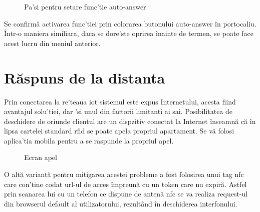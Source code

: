 \begin{figure}[H]
\begin{center}
  \hfil
  \caption{Pa'si pentru setare func'tie auto-answer}
  \label{fig:autoanswer}
\end{center}
\end{figure}

Se confirmă activarea func'tiei prin colorarea butonului auto-answer în portocaliu. Într-o maniera similiara, daca se dore'ste oprirea înainte de termen, se poate face acest lucru din meniul anterior.

\section{Răspuns de la distanta}

Prin conectarea la re'teaua \acrshort{iot} sistemul este expus Internetului, acesta fiind avantajul solu'tiei, dar 'si unul din factorii limitanti ai sai. Posibilitatea de deschidere de oriunde clientul are un dispzitiv conectat la Internet înseamnă că în lipsa cartelei standard \acrfull{rfid} se poate apela propriul apartament. Se vă folosi aplica'tia mobila pentru a se raspunde la propriul apel.

\begin{figure}[H]
\begin{center}
  \hfil
  \caption{Ecran apel}
  \label{fig:ringing}
\end{center}
\end{figure}

O altă variantă pentru mitigarea acestei probleme a fost folosirea unui tag \acrfull{nfc} care con'tine codat url-ul de acces împreună cu un token care nu expiră. Astfel prin scanarea lui cu un telefon ce dispune de antenă \acrshort{nfc} se va realiza request-ul din browserul default al utilizatorului, rezultând în deschiderea interfonului.